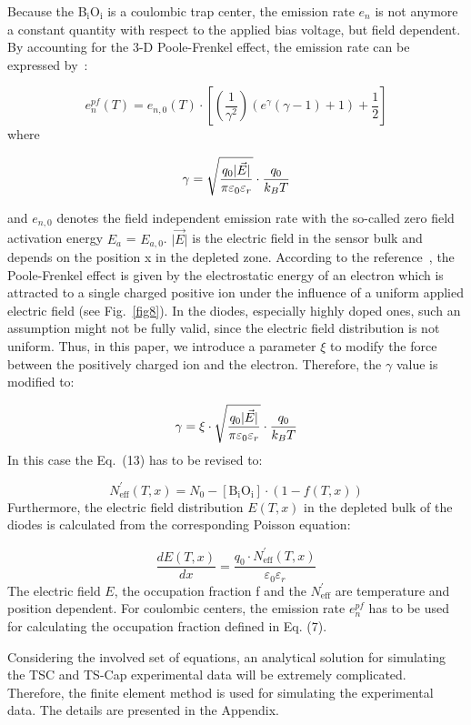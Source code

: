 \documentclass[final, 5p, times]{elsarticle}
\begin{document}
Because the B$_\text{i}$O$_\text{i}$ is a coulombic trap center, the emission rate $e_n$ is not
anymore a constant quantity with respect to the applied bias voltage, but field dependent. By accounting for the 3-D Poole-Frenkel effect, the emission rate can be expressed by~\cite{b20,b28,b29}:
\par
\begin{equation} 
e^{pf}_{n} (T) = e_{n,0} (T) \cdot \left[\left(\frac{1}{\gamma^2}\right)\left(e^{\gamma}\left(\gamma-1\right)+1\right)+ \frac{1}{2}\right]
\end{equation}
where
\par
\begin{equation}
\gamma = \sqrt{q_0
\lvert \vec{E} \rvert \over {\pi \varepsilon_0 \varepsilon_r}} \cdot {q_0 \over
{k_B T}}
\end{equation}
\par
and $e_{n,0}$ denotes the field independent emission rate with the so-called zero
field activation energy $E_a$ = $E_{a,0}$. ${\lvert \vec{E} \rvert}$ is the electric field in the sensor bulk and depends on the position x in the depleted zone. According to the reference~\cite{b29}, the Poole-Frenkel effect is given by the electrostatic energy of an electron which is attracted to a single charged positive ion under the influence of a uniform applied electric field (see Fig.~\ref{fig8}). In the diodes, especially highly doped ones, such an assumption might not be fully valid, since the electric field distribution is not uniform. Thus, in this paper, we introduce a parameter $\xi$ to modify the force between the positively charged ion and the electron. Therefore, the $\gamma$ value is modified to:
\par
\begin{equation}
\gamma = \xi \cdot \sqrt{q_0
\lvert \vec{E} \rvert \over {\pi \varepsilon_0 \varepsilon_r}} \cdot {q_0 \over
{k_B T}}
\end{equation}
In this case the Eq.~(13) has to be revised to:
\par
\begin{equation} 
N^{'}_\text{eff} (T, x) = N_{0} - [\text{B}_\text{i}\text{O}_\text{i}] \cdot (1-f(T,x))
\end{equation}
Furthermore, the electric field distribution $E(T, x)$ in the depleted bulk of the diodes is calculated from the corresponding Poisson equation:
\par
\begin{equation} 
\frac{dE(T, x)}{dx} = \frac{q_0 \cdot N^{'}_\text{eff}(T, x)}{\varepsilon_0 \varepsilon_r}
\end{equation}
The electric field $E$, the occupation fraction f and the $N^{'}_\text{eff}$ are temperature and position dependent. For coulombic centers, the emission rate $e^{pf}_{n}$ has to be used for calculating the occupation fraction defined in Eq. (7).
\par
Considering the involved set of equations, an analytical solution for simulating the TSC and TS-Cap experimental data will be extremely complicated. Therefore, the finite element method is used for simulating the experimental data. The details are presented in the Appendix.
\end{document}
